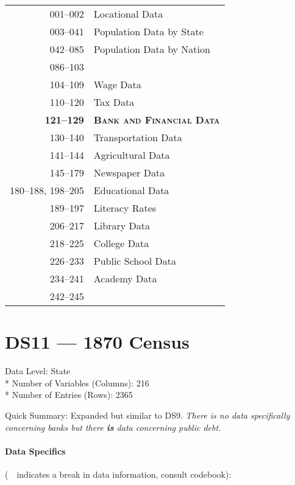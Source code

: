 ﻿\documentclass[12pt]{report}
\begin{document}
	\begin{tabular}{r|l}
		001--002 & Locational Data\\
		003--041 & Population Data by State\\
		042--085 & Population Data by Nation\\
		086--103 & \guillemotleft~\guillemotright\\
		104--109 & Wage Data\\
		110--120 & Tax Data\\
		\textbf{121--129} & \textsc{\textbf{Bank and Financial Data}}\\
		130--140 & Transportation Data\\
		141--144 & Agricultural Data\\
		145--179 & Newspaper Data\\
		180--188, 198--205 & Educational Data\\
		189--197 & Literacy Rates\\
		206--217 & Library Data\\
		218--225 & College Data\\
		226--233 & Public School Data\\
		234--241 & Academy Data\\
		242--245 & \guillemotleft~\guillemotright\\
	\end{tabular}
	\newpage

\section{DS11 --- 1870 Census}
	Data Level: State\\*
	Number of Variables (Columns): 216\\*
	Number of Entries (Rows): 2365
	\vspace{1.5em}
	
	\noindent Quick Summary: Expanded but similar to DS9. \textit{There is no data specifically concerning banks but there \emph{\textbf{is}} data concerning public debt.}
	
	\paragraph{Data Specifics} (\guillemotleft~\guillemotright~indicates a break in data information, consult codebook):
	\vspace{1em}
	
\end{document}
